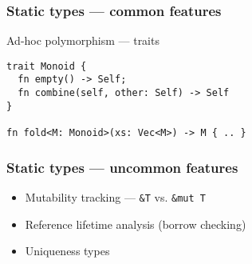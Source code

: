 \documentclass[t]{beamer}
\begin{document}
\begin{frame}[c,fragile]
\frametitle{Static types --- common features}

\begin{block}{Ad-hoc polymorphism --- traits}
\begin{verbatim}
trait Monoid {
  fn empty() -> Self;
  fn combine(self, other: Self) -> Self
}

fn fold<M: Monoid>(xs: Vec<M>) -> M { .. }
\end{verbatim}
\end{block}

\end{frame}


\begin{frame}[c,fragile]
\frametitle{Static types --- uncommon features}

\begin{itemize}
\item Mutability tracking --- \texttt{\&T} vs. \texttt{\&mut T}
\item Reference lifetime analysis (borrow checking)
\item Uniqueness types
\end{itemize}

\end{frame}
\end{document}
